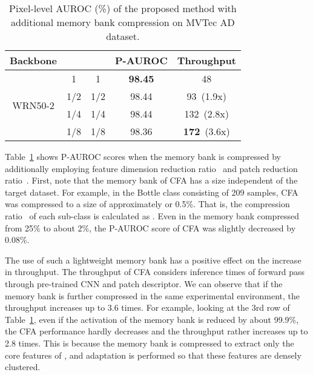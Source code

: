\documentclass[10pt,twocolumn,letterpaper]{article}
\begin{document}
        \begin{table}[t!]
\caption{Pixel-level AUROC (\%) of the proposed method with additional memory bank compression on MVTec AD dataset.}
\begin{center}\small
\begin{tabular}{c | c c | c | c}
    \toprule
    Backbone                   &  &  & P-AUROC  & Throughput \\
    \midrule
    \multirow{4}{*}{WRN50-2}   &    1       &    1       &   \textbf{98.45}  &  48  \\  
                               &    1/2     &    1/2     &   98.44  &  93~(1.9x)    \\    
                               &    1/4     &    1/4     &   98.44  &  132~(2.8x)   \\  
                               &    1/8     &    1/8     &   98.36  &  \textbf{172}~(3.6x)\\  
    \bottomrule
\end{tabular}
\end{center}
\label{table:compression-ablation}\vspace{-0.15cm}
\end{table}         Table~\ref{table:compression-ablation} shows P-AUROC scores when the memory bank is compressed by additionally employing feature dimension reduction ratio~ and patch reduction ratio~. First, note that the memory bank of CFA has a size independent of the target dataset. For example, in the Bottle class consisting of 209 samples, CFA was compressed to a size of approximately  or 0.5\%. That is, the compression ratio~ of each sub-class is calculated as . Even in the memory bank compressed from 25\% to about 2\%, the P-AUROC score of CFA was slightly decreased by 0.08\%.
        
        The use of such a lightweight memory bank has a positive effect on the increase in throughput. The throughput of CFA considers inference times of forward pass through pre-trained CNN and patch descriptor. We can observe that if the memory bank is further compressed in the same experimental environment, the throughput increases up to 3.6 times. For example, looking at the 3rd row of Table~\ref{table:compression-ablation}, even if the activation of the memory bank is reduced by about 99.9\%, the CFA performance hardly decreases and the throughput rather increases up to 2.8 times. This is because the memory bank is compressed to extract only the core features of , and adaptation is performed so that these features are densely clustered.
        
\end{document}
